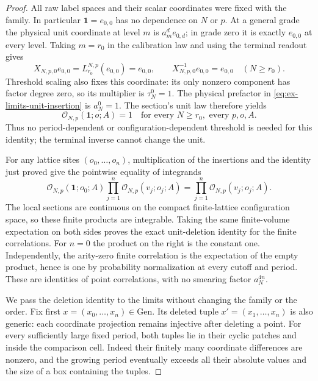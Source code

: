\begin{proof}
All raw label spaces and their scalar coordinates were fixed with the
family. In particular $\mathbf1=e_{0,0}$ has no dependence on $N$ or $p$.
At a general grade the physical unit coordinate at level $m$ is
$a_m^d e_{0,d}$; in grade zero it is exactly $e_{0,0}$ at every level.
Taking $m=r_0$ in the calibration law and using the terminal readout gives
\[
 X_{N,p,0}e_{0,0}=L_{r_0}^{N,p}(e_{0,0})=e_{0,0},
 \qquad X_{N,p,0}^{-1}e_{0,0}=e_{0,0}
 \quad(N\ge r_0).
\]
Threshold scaling also fixes this coordinate: its only nonzero component
has factor degree zero, so its multiplier is $\tau_N^0=1$.
The physical prefactor in \eqref{eq:ex-limits-unit-insertion} is
$a_N^0=1$. The section's unit law therefore yields
\[
 \mathcal O_{N,p}(\mathbf1;o;A)=1
 \quad\text{for every }N\ge r_0,
       \text{ every }p,o,A.
\]
Thus no period-dependent or configuration-dependent threshold is needed
for this identity; the terminal inverse cannot change the unit.

For any lattice sites $(o_0,\ldots,o_n)$, multiplication of the insertions
and the identity just proved give the pointwise equality of integrands
\[
 \mathcal O_{N,p}(\mathbf1;o_0;A)
       \prod_{j=1}^n\mathcal O_{N,p}(v_j;o_j;A)
 =\prod_{j=1}^n\mathcal O_{N,p}(v_j;o_j;A).
\]
The local sections are continuous on the compact finite-lattice configuration
space, so these finite products are integrable. Taking the same
finite-volume expectation on both sides proves the exact
unit-deletion identity for the finite correlations. For $n=0$ the product
on the right is the constant one. Independently, the arity-zero finite
correlation is the expectation of the empty product, hence is one by
probability normalization at every cutoff and period. These are identities
of point correlations, with no smearing factor $a_N^{4n}$.

We pass the deletion identity to the limits without changing the family
or the order. Fix first $x=(x_0,\ldots,x_n)\in\mathrm{Gen}$. Its deleted
tuple $x'=(x_1,\ldots,x_n)$ is also generic: each coordinate projection
remains injective after deleting a point. For every sufficiently large
fixed period, both tuples lie in their cyclic patches and inside the
comparison cell. Indeed their finitely many coordinate differences are
nonzero, and the growing period eventually exceeds all their absolute
values and the size of a box containing the tuples.


\end{proof}
